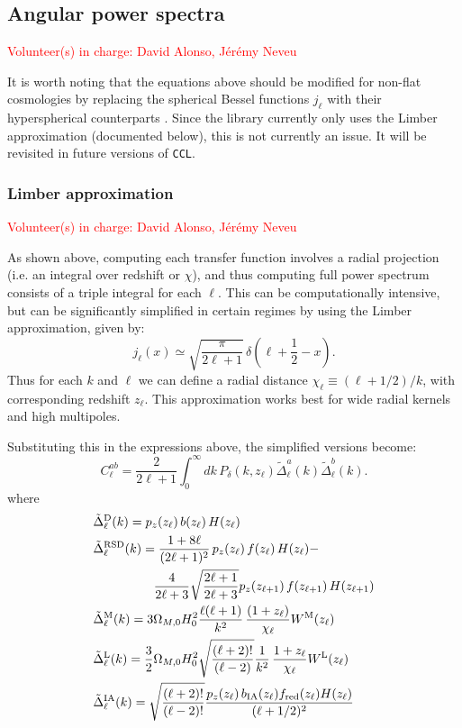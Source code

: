 \documentclass[\docopts]{\docclass}
\newcommand{\vol}[1]{\textcolor{red}{Volunteer(s) in charge: #1}}
\newcommand{\ccl}{{\tt CCL}\xspace}
\begin{document}
\subsection{Angular power spectra}
\vol{David Alonso, J\'er\'emy Neveu}

It is worth noting that the equations above should be modified for non-flat cosmologies by replacing the spherical Bessel functions $j_\ell$ with their hyperspherical counterparts \cite{1994ApJ...432....7K}. Since the library currently only uses the Limber approximation (documented below), this is not currently an issue. It will be revisited in future versions of \ccl.

\subsubsection{Limber approximation}
\vol{David Alonso, J\'er\'emy Neveu}

As shown above, computing each transfer function involves a radial projection (i.e. an integral over redshift or $\chi$), and thus computing full power spectrum consists of a triple integral for each $\ell$. This can be computationally intensive, but can be significantly simplified in certain regimes by using the Limber approximation, given by:
\begin{equation}
 j_\ell(x)\simeq\sqrt{\frac{\pi}{2\ell+1}}\,\delta\left(\ell+\frac{1}{2}-x\right).
\end{equation}
Thus for each $k$ and $\ell$ we can define a radial distance $\chi_\ell\equiv(\ell+1/2)/k$, with corresponding redshift $z_\ell$. This approximation works best for wide radial kernels and high multipoles.

Substituting this in the expressions above, the simplified versions become:
\begin{equation}\label{eq:limber}
 C^{ab}_\ell=\frac{2}{2\ell+1}\int_0^\infty dk\,P_\delta\left(k,z_\ell\right)
 \tilde{\Delta}^a_\ell(k)\tilde{\Delta}^b_\ell(k).
\end{equation}
where
\begin{align}
 &\tilde{\Delta}_\ell^{\rm D}(k)=p_z(z_\ell)\,b(z_\ell)\,H(z_\ell)\\
 &\tilde{\Delta}_\ell^{\rm RSD}(k)=
 \frac{1+8\ell}{(2\ell+1)^2}\,p_z(z_\ell)\,f(z_\ell)\,H(z_\ell)-\\
 &\hspace{48pt}\frac{4}{2\ell+3}\sqrt{\frac{2\ell+1}{2\ell+3}}p_z(z_{\ell+1})\,f(z_{\ell+1})\,H(z_{\ell+1})\\
 &\tilde{\Delta}_\ell^{\rm M}(k)=3\Omega_{M,0}H_0^2\frac{\ell(\ell+1)}{k^2}\,
 \frac{(1+z_\ell)}{\chi_\ell}W^{\rm M}(z_\ell)\\
 &\tilde{\Delta}_\ell^{\rm L}(k)=\frac{3}{2}\Omega_{M,0}H_0^2\sqrt{\frac{(\ell+2)!}{(\ell-2)}}\frac{1}{k^2}\,
 \frac{1+z_\ell}{\chi_\ell}W^{\rm L}(z_\ell)\\
 &\tilde{\Delta}_\ell^{\rm IA}(k)=\sqrt{\frac{(\ell+2)!}{(\ell-2)!}}\frac{p_z(z_\ell)\,b_{\rm IA}(z_\ell)f_{\rm red}(z_\ell)H(z_\ell)}{(\ell+1/2)^2}
\end{align}
\end{document}
